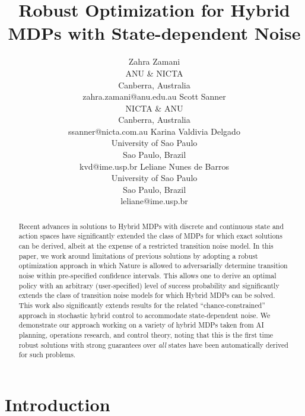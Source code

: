 \documentclass[letterpaper]{article}
\title{	Robust Optimization for Hybrid MDPs with State-dependent Noise }
\author{Zahra Zamani\\
ANU \& NICTA\\
Canberra, Australia\\
zahra.zamani@anu.edu.au
\And
Scott Sanner\\
NICTA \& ANU\\
Canberra, Australia\\
ssanner@nicta.com.au
\And
Karina Valdivia Delgado\\
University of Sao Paulo\\
Sao Paulo, Brazil\\
kvd@ime.usp.br
\And
Leliane Nunes de Barros\\
University of Sao Paulo\\
Sao Paulo, Brazil\\
leliane@ime.usp.br}
\begin{document}
\maketitle

\begin{abstract}
Recent advances in solutions to Hybrid MDPs with discrete and
continuous state and action spaces have significantly extended the
class of MDPs for which exact solutions can be derived, albeit at the
expense of a restricted transition noise model.  In this paper, we
work around limitations of previous solutions by adopting a robust
optimization approach in which Nature is allowed to adversarially
determine transition noise within pre-specified confidence
intervals.  This allows one to derive an optimal policy with an
arbitrary (user-specified) level of success probability and
significantly extends the class of transition noise models for which
Hybrid MDPs can be solved.  This work also significantly extends
results for the related ``chance-constrained'' approach in stochastic
hybrid control to accommodate state-dependent noise.  We demonstrate
our approach working on a variety of hybrid MDPs taken from AI
planning, operations research, and control theory, noting that this is
the first time robust solutions with strong guarantees over \emph{all} states
have been automatically derived for such problems.
\end{abstract}

\section{Introduction}
\end{document}
